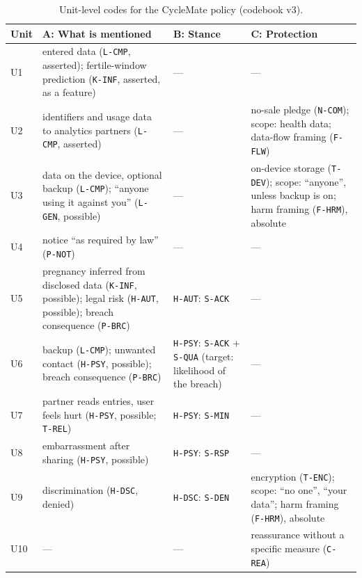 \begin{table}[H]
\centering
\caption{Unit-level codes for the CycleMate policy (codebook v3).}
\label{tab:we-units}
\small
\begin{tabularx}{\textwidth}{@{}l>{\raggedright\arraybackslash}X
                                   >{\raggedright\arraybackslash}p{2.9cm}
                                   >{\raggedright\arraybackslash}X@{}}
\toprule
\textbf{Unit} & \textbf{A: What is mentioned} & \textbf{B: Stance} &
  \textbf{C: Protection} \\
\midrule
U1 & entered data (\texttt{L-CMP}, asserted); fertile-window prediction
     (\texttt{K-INF}, asserted, as a feature) & --- & --- \\
U2 & identifiers and usage data to analytics partners (\texttt{L-CMP},
     asserted) & --- & no-sale pledge (\texttt{N-COM}); scope: health data;
     data-flow framing (\texttt{F-FLW}) \\
U3 & data on the device, optional backup (\texttt{L-CMP}); \enquote{anyone
     using it against you} (\texttt{L-GEN}, possible) & ---
   & on-device storage (\texttt{T-DEV}); scope: \enquote{anyone}, unless
     backup is on; harm framing (\texttt{F-HRM}), absolute \\
U4 & notice \enquote{as required by law} (\texttt{P-NOT}) & --- & --- \\
U5 & pregnancy inferred from disclosed data (\texttt{K-INF}, possible); legal
     risk (\texttt{H-AUT}, possible); breach consequence (\texttt{P-BRC})
   & \texttt{H-AUT}: \texttt{S-ACK} & --- \\
U6 & backup (\texttt{L-CMP}); unwanted contact (\texttt{H-PSY}, possible);
     breach consequence (\texttt{P-BRC})
   & \texttt{H-PSY}: \texttt{S-ACK} + \texttt{S-QUA} (target: likelihood of
     the breach) & --- \\
U7 & partner reads entries, user feels hurt (\texttt{H-PSY}, possible;
     \texttt{T-REL}) & \texttt{H-PSY}: \texttt{S-MIN} & --- \\
U8 & embarrassment after sharing (\texttt{H-PSY}, possible)
   & \texttt{H-PSY}: \texttt{S-RSP} & --- \\
U9 & discrimination (\texttt{H-DSC}, denied) & \texttt{H-DSC}: \texttt{S-DEN}
   & encryption (\texttt{T-ENC}); scope: \enquote{no one}, \enquote{your
     data}; harm framing (\texttt{F-HRM}), absolute \\
U10 & --- & --- & reassurance without a specific measure (\texttt{C-REA}) \\
\bottomrule
\end{tabularx}
\end{table}

